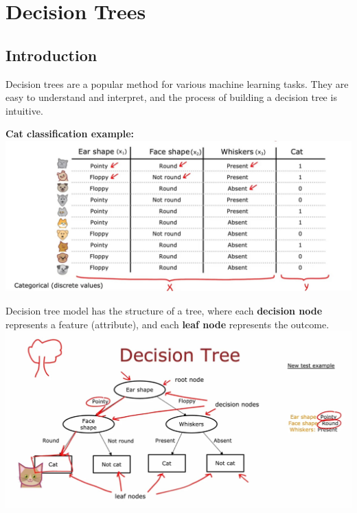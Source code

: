 \chapter{Decision Trees}
\section{Introduction}
Decision trees are a popular method for various machine learning tasks. 
They are easy to understand and interpret, and the process of building a decision tree is intuitive.
\par
\noindent
{\large \textbf{Cat classification example:}}
\\
\includegraphics[width=\textwidth]{images/11.1}
\par
Decision tree model has the structure of a tree,
where each \textbf{decision node} represents a feature (attribute),  
and each \textbf{leaf node} represents the outcome.\\
\includegraphics[width=\textwidth]{images/11.2}
\par
